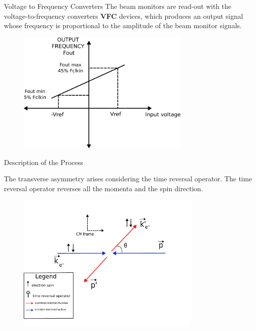 \documentclass[9pt,a4paper]{beamer}
\begin{document}
\begin{frame}[noframenumbering]{Voltage to Frequency Converters}
The beam monitors are read-out with the voltage-to-frequency converters \textbf{VFC} devices, which produces an output signal whose frequency is proportional to the amplitude of the beam monitor signals. 
\begin{figure}
\includegraphics[width = 0.75\textwidth]{figures/Vfc.pdf}
\end{figure}
\end{frame}

\begin{frame}[noframenumbering]{Description of the Process}

The transverse asymmetry arises considering the time reversal operator. The time reversal operator reverses all the momenta and the spin direction.

\begin{figure}[hbtp]
\centering
\includegraphics[width = 0.8\textwidth]{figures/ScatteringScheme.pdf}
\end{figure}
\end{frame}
\end{document}
